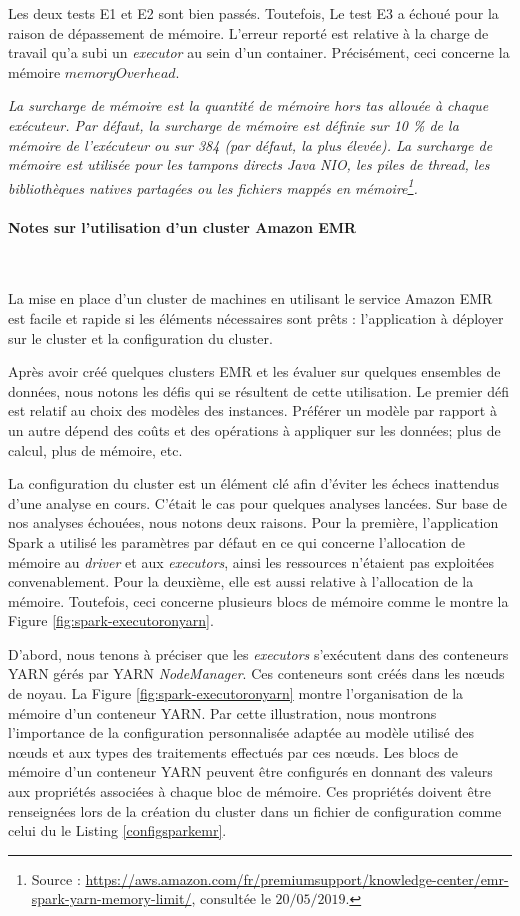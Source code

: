 Les deux tests E1 et E2 sont bien passés. Toutefois, Le test E3 a échoué pour la raison de dépassement de mémoire. L'erreur reporté est relative à la charge de travail qu'a subi un \textit{executor} au sein d'un container. Précisément, ceci concerne la mémoire $ memoryOverhead $. 

\textit{La surcharge de mémoire est la quantité de mémoire hors tas allouée à chaque exécuteur. Par défaut, la surcharge de mémoire est définie sur 10 \% de la mémoire de l'exécuteur ou sur 384 (par défaut, la plus élevée). La surcharge de mémoire est utilisée pour les tampons directs Java NIO, les piles de thread, les bibliothèques natives partagées ou les fichiers mappés en mémoire\footnote{Source : \url{https://aws.amazon.com/fr/premiumsupport/knowledge-center/emr-spark-yarn-memory-limit/}, consultée le $20/05/2019$.}.}

\paragraph{Notes sur l'utilisation d'un cluster Amazon EMR}~

La mise en place d'un cluster de machines en utilisant le service Amazon EMR est facile et rapide si les éléments nécessaires sont prêts : l'application à déployer sur le cluster et la configuration du cluster.

Après avoir créé quelques clusters EMR et les évaluer sur quelques ensembles de données, nous notons les défis qui se résultent de cette utilisation. 
Le premier défi est relatif au  choix des modèles des instances. Préférer un modèle par rapport à un autre dépend des coûts et   des opérations à appliquer sur les données; plus de calcul, plus de mémoire, etc.

La configuration du cluster est un élément clé afin d'éviter les échecs inattendus d'une analyse en cours. C'était le cas pour  quelques analyses lancées. Sur base de nos  analyses échouées, nous notons deux  raisons. Pour la première,  l'application Spark a  utilisé les paramètres par défaut en ce qui concerne l'allocation de mémoire au  \textit{driver} et aux \textit{executors}, ainsi les ressources n'étaient pas exploitées convenablement.  Pour la deuxième, elle est aussi relative  à l'allocation de la mémoire. Toutefois, ceci concerne plusieurs blocs de mémoire comme le montre la Figure 	\ref{fig:spark-executoronyarn}.


D'abord, nous tenons à préciser que les \textit{executors} s'exécutent dans des conteneurs YARN gérés par YARN \textit{NodeManager}. Ces conteneurs sont créés dans les n\oe{}uds de noyau. La Figure 	\ref{fig:spark-executoronyarn} montre l'organisation de la mémoire d'un conteneur YARN. Par cette illustration, nous montrons l'importance de la configuration personnalisée adaptée au modèle utilisé  des n\oe{}uds et aux types des traitements effectués par ces n\oe{}uds. 
Les blocs de mémoire d'un conteneur YARN   peuvent être configurés en donnant des valeurs aux propriétés associées à chaque bloc de mémoire. Ces propriétés doivent être renseignées lors de la création du cluster  dans un fichier de configuration  comme celui du le Listing \ref{configsparkemr}.

